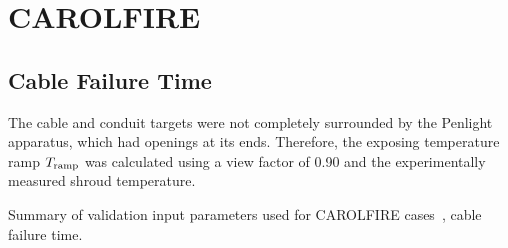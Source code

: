 \clearpage


\section{CAROLFIRE}

\subsection*{Cable Failure Time~\cite{CAROLFIRE}}

The cable and conduit targets were not completely surrounded by the Penlight apparatus, which had openings at its ends. Therefore, the exposing temperature ramp $T\sb{ramp}$ was calculated using a view factor of 0.90 and the experimentally measured shroud temperature.

\begin{table}[!ht]
\caption[Validation input parameters for CAROLFIRE cases, cable failure time]
{Summary of validation input parameters used for CAROLFIRE cases~\cite{CAROLFIRE}, cable failure time.}


\end{table}

